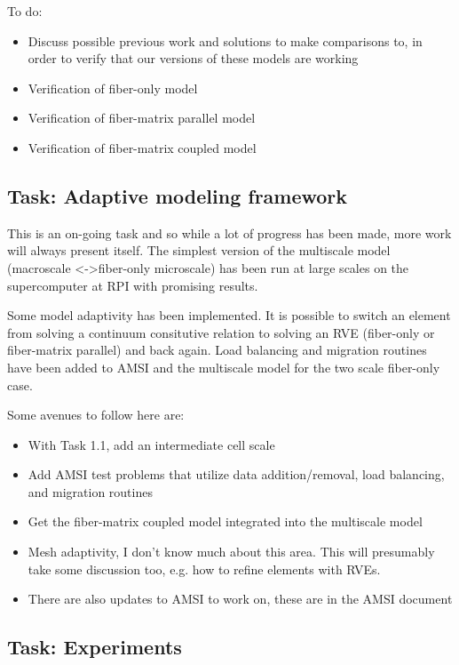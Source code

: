 \documentclass{article}
\begin{document}
To do:

\begin{itemize}
\item Discuss possible previous work and solutions to make comparisons to, in order to verify that our versions of these models are working
\item Verification of fiber-only model
\item Verification of fiber-matrix parallel model
\item Verification of fiber-matrix coupled model 
\end{itemize}

\subsection{Task: Adaptive modeling framework}

This is an on-going task and so while a lot of progress has been made, more work will always present itself. The simplest version of the multiscale model (macroscale \textless-\textgreater fiber-only microscale) has been run at large scales on the supercomputer at RPI with promising results.

Some model adaptivity has been implemented. It is possible to switch an element from solving a continuum consitutive relation to solving an RVE (fiber-only or fiber-matrix parallel) and back again. Load balancing and migration routines have been added to AMSI and the multiscale model for the two scale fiber-only case.

Some avenues to follow here are:

\begin{itemize}

\item With Task 1.1, add an intermediate cell scale
\item Add AMSI test problems that utilize data addition/removal, load balancing, and migration routines
\item Get the fiber-matrix coupled model integrated into the multiscale model
\item Mesh adaptivity, I don't know much about this area. This will presumably take some discussion too, e.g. how to refine elements with RVEs.
\item There are also updates to AMSI to work on, these are in the AMSI document
\end{itemize}


\subsection{Task: Experiments}
\end{document}
